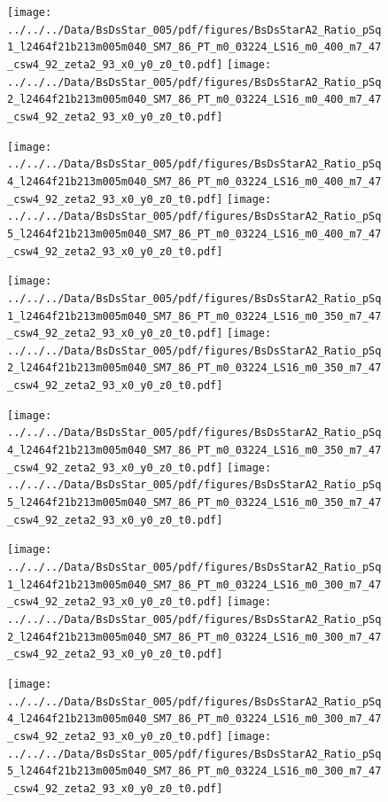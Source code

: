 \documentclass[a4paper,10pt]{article}
\begin{document}
\begin{figure}[p]
 \texttt{[image: ../../../Data/BsDsStar\_005/pdf/figures/BsDsStarA2\_Ratio\_pSq1\_l2464f21b213m005m040\_SM7\_86\_PT\_m0\_03224\_LS16\_m0\_400\_m7\_47\_csw4\_92\_zeta2\_93\_x0\_y0\_z0\_t0.pdf]} 
 \texttt{[image: ../../../Data/BsDsStar\_005/pdf/figures/BsDsStarA2\_Ratio\_pSq2\_l2464f21b213m005m040\_SM7\_86\_PT\_m0\_03224\_LS16\_m0\_400\_m7\_47\_csw4\_92\_zeta2\_93\_x0\_y0\_z0\_t0.pdf]} 
 \end{figure}
\begin{figure}[p]
 \texttt{[image: ../../../Data/BsDsStar\_005/pdf/figures/BsDsStarA2\_Ratio\_pSq4\_l2464f21b213m005m040\_SM7\_86\_PT\_m0\_03224\_LS16\_m0\_400\_m7\_47\_csw4\_92\_zeta2\_93\_x0\_y0\_z0\_t0.pdf]} 
 \texttt{[image: ../../../Data/BsDsStar\_005/pdf/figures/BsDsStarA2\_Ratio\_pSq5\_l2464f21b213m005m040\_SM7\_86\_PT\_m0\_03224\_LS16\_m0\_400\_m7\_47\_csw4\_92\_zeta2\_93\_x0\_y0\_z0\_t0.pdf]} 
 \end{figure}
\begin{figure}[p]
 \texttt{[image: ../../../Data/BsDsStar\_005/pdf/figures/BsDsStarA2\_Ratio\_pSq1\_l2464f21b213m005m040\_SM7\_86\_PT\_m0\_03224\_LS16\_m0\_350\_m7\_47\_csw4\_92\_zeta2\_93\_x0\_y0\_z0\_t0.pdf]} 
 \texttt{[image: ../../../Data/BsDsStar\_005/pdf/figures/BsDsStarA2\_Ratio\_pSq2\_l2464f21b213m005m040\_SM7\_86\_PT\_m0\_03224\_LS16\_m0\_350\_m7\_47\_csw4\_92\_zeta2\_93\_x0\_y0\_z0\_t0.pdf]} 
 \end{figure}
\clearpage
\begin{figure}[p]
 \texttt{[image: ../../../Data/BsDsStar\_005/pdf/figures/BsDsStarA2\_Ratio\_pSq4\_l2464f21b213m005m040\_SM7\_86\_PT\_m0\_03224\_LS16\_m0\_350\_m7\_47\_csw4\_92\_zeta2\_93\_x0\_y0\_z0\_t0.pdf]} 
 \texttt{[image: ../../../Data/BsDsStar\_005/pdf/figures/BsDsStarA2\_Ratio\_pSq5\_l2464f21b213m005m040\_SM7\_86\_PT\_m0\_03224\_LS16\_m0\_350\_m7\_47\_csw4\_92\_zeta2\_93\_x0\_y0\_z0\_t0.pdf]} 
 \end{figure}
\begin{figure}[p]
 \texttt{[image: ../../../Data/BsDsStar\_005/pdf/figures/BsDsStarA2\_Ratio\_pSq1\_l2464f21b213m005m040\_SM7\_86\_PT\_m0\_03224\_LS16\_m0\_300\_m7\_47\_csw4\_92\_zeta2\_93\_x0\_y0\_z0\_t0.pdf]} 
 \texttt{[image: ../../../Data/BsDsStar\_005/pdf/figures/BsDsStarA2\_Ratio\_pSq2\_l2464f21b213m005m040\_SM7\_86\_PT\_m0\_03224\_LS16\_m0\_300\_m7\_47\_csw4\_92\_zeta2\_93\_x0\_y0\_z0\_t0.pdf]} 
 \end{figure}
\begin{figure}[p]
 \texttt{[image: ../../../Data/BsDsStar\_005/pdf/figures/BsDsStarA2\_Ratio\_pSq4\_l2464f21b213m005m040\_SM7\_86\_PT\_m0\_03224\_LS16\_m0\_300\_m7\_47\_csw4\_92\_zeta2\_93\_x0\_y0\_z0\_t0.pdf]} 
 \texttt{[image: ../../../Data/BsDsStar\_005/pdf/figures/BsDsStarA2\_Ratio\_pSq5\_l2464f21b213m005m040\_SM7\_86\_PT\_m0\_03224\_LS16\_m0\_300\_m7\_47\_csw4\_92\_zeta2\_93\_x0\_y0\_z0\_t0.pdf]} 
 \end{figure}
\clearpage
\clearpage
\end{document}
